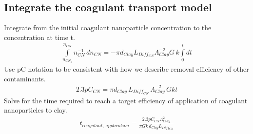 \documentclass[letterpaper,10pt,english]{sphinxmanual}
\begin{document}
\subsection{Integrate the coagulant transport model}
\label{\detokenize{Rapid_Mix/RM_Theory_and_Future_Work:integrate-the-coagulant-transport-model}}\label{\detokenize{Rapid_Mix/RM_Theory_and_Future_Work:heading-integrate-the-coagulant-transport-model}}
Integrate from the initial coagulant nanoparticle concentration to the concentration at time t.
\begin{equation}\label{equation:Rapid_Mix/RM_Theory_and_Future_Work:Rapid_Mix/RM_Theory_and_Future_Work:14}
\begin{split}\int \limits_{n_{CN_0}}^{n_{CN}} n_{CN}^{- 1} \, dn_{CN}  =  - \pi d_{Clay} L_{Diff_{CN}} \Lambda^{-2}_{Clay} G \, k  \int \limits_0^t {dt}\end{split}
\end{equation}
Use pC notation to be consistent with how we describe removal efficiency of other contaminants.
\begin{equation}\label{equation:Rapid_Mix/RM_Theory_and_Future_Work:Rapid_Mix/RM_Theory_and_Future_Work:15}
\begin{split}2.3 p C_{CN} = \pi d_{Clay}\,  L_{Diff_{CN}}\,  \Lambda^{-2}_{Clay}\,  G k  t\end{split}
\end{equation}
Solve for the time required to reach a target efficiency of application of coagulant nanoparticles to clay.
\begin{equation}\label{equation:Rapid_Mix/RM_Theory_and_Future_Work:Rapid_Mix/RM_Theory_and_Future_Work:16}
\begin{split}t_{coagulant, \, application} = \frac{2.3p C_{CN} \Lambda_{Clay}^2}{\pi G k \, d_{Clay}  L_{Diff_{CN}} }\end{split}
\end{equation}
\end{document}
